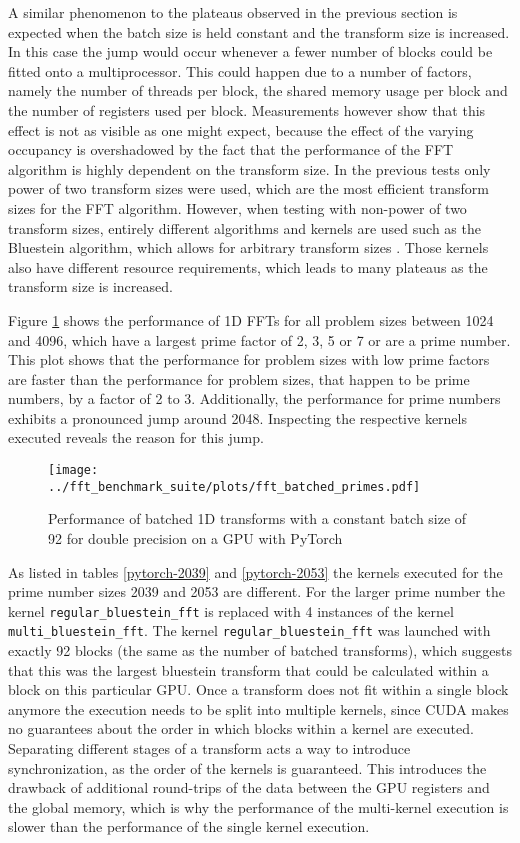 \documentclass[english,11pt,a4paper,table]{article} %
\begin{document}
A similar phenomenon to the plateaus observed in the previous section is expected when the batch size is held constant and the transform size is increased.
In this case the jump would occur whenever a fewer number of blocks could be fitted onto a multiprocessor. This could happen due to a number of factors, namely the number of threads per block, the shared memory usage per block and the number of registers used per block.
Measurements however show that this effect is not as visible as one might expect, because the effect of the varying occupancy is overshadowed by the fact that the performance of the FFT algorithm is highly dependent on the transform size.
In the previous tests only power of two transform sizes were used, which are the most efficient transform sizes for the FFT algorithm.
However, when testing with non-power of two transform sizes, entirely different algorithms and kernels are used such as the Bluestein algorithm, which allows for arbitrary transform sizes \cite{rabiner1985bluestein}.
Those kernels also have different resource requirements, which leads to many plateaus as the transform size is increased. 

Figure \ref{batched-double-1024-4096} shows the performance of 1D FFTs for all problem sizes between 1024 and 4096, which have a largest prime factor of 2, 3, 5 or 7 or are a prime number.
This plot shows that the performance for problem sizes with low prime factors are faster than the performance for problem sizes, that happen to be prime numbers, by a factor of 2 to 3.
Additionally, the performance for prime numbers exhibits a pronounced jump around 2048.
Inspecting the respective kernels executed reveals the reason for this jump.

\begin{figure}[H]
	\centering
	\texttt{[image: ../fft\_benchmark\_suite/plots/fft\_batched\_primes.pdf]}
	\caption{Performance of batched 1D transforms with a constant batch size of 92 for double precision on a GPU with PyTorch}
	\label{batched-double-1024-4096}
\end{figure}

As listed in tables \ref{pytorch-2039} and \ref{pytorch-2053} the kernels executed for the prime number sizes 2039 and 2053 are different.
For the larger prime number the kernel \texttt{regular\_bluestein\_fft} is replaced with 4 instances of the kernel \texttt{multi\_bluestein\_fft}.
The kernel \texttt{regular\_bluestein\_fft} was launched with exactly 92 blocks (the same as the number of batched transforms), which suggests that this was the largest bluestein transform that could be calculated within a block on this particular GPU.
Once a transform does not fit within a single block anymore the execution needs to be split into multiple kernels, since CUDA makes no guarantees about the order in which blocks within a kernel are executed.
Separating different stages of a transform acts a way to introduce synchronization, as the order of the kernels is guaranteed.
This introduces the drawback of additional round-trips of the data between the GPU registers and the global memory, which is why the performance of the multi-kernel execution is slower than the performance of the single kernel execution.
\end{document}

